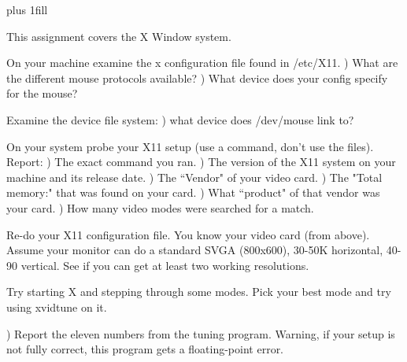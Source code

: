 
\rightskip=0pt plus 1fill

\parindent 0pt

This assignment covers the X Window system.

On your machine examine the x configuration file found in {\ltt{}/etc/X11}.
\hfill{}) What are the different mouse protocols available?
\hfill{}) What device does your config specify for the mouse?

Examine the device file system:
\hfill{}) what device does {\ltt{}/dev/mouse} link to?

On your system probe your X11 setup (use a command, don't use
the files).
Report:
\hfill{}) The exact command you ran.
\hfill{}) The version of the X11 system on your machine and its release date.
\hfill{}) The ``Vendor" of your video card.
\hfill{}) The "Total memory:" that was found on your card.
\hfill{}) What ``product" of that vendor was your card.
\hfill{}) How many video modes were searched for a match.

Re-do your X11 configuration file.
You know your video card (from above).
Assume your monitor can do a standard SVGA (800x600), 30-50K horizontal,
40-90 vertical.
See if you can get at least two working resolutions.

Try starting X and stepping through some modes. Pick your
best mode and try using {\ltt{}xvidtune} on it.

\hfill{}) Report the eleven numbers from the tuning program.
Warning, if your setup is not fully correct,
this program gets a floating-point error.

\bye
